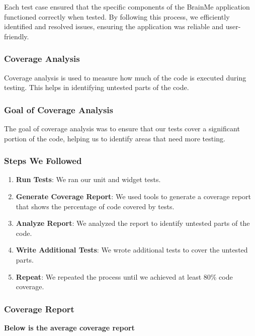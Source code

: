 \vspace{1cm}

Each test case ensured that the specific components of the BrainMe application functioned correctly when tested. By following this process, we efficiently identified and resolved issues, ensuring the application was reliable and user-friendly.

\subsubsection{Coverage Analysis}

Coverage analysis is used to measure how much of the code is executed during testing. This helps in identifying untested parts of the code.

\subsubsection{Goal of Coverage Analysis}

The goal of coverage analysis was to ensure that our tests cover a significant portion of the code, helping us to identify areas that need more testing.

\subsubsection{Steps We Followed}

\begin{enumerate}
    \item \textbf{Run Tests}: We ran our unit and widget tests.
    \item \textbf{Generate Coverage Report}: We used tools to generate a coverage report that shows the percentage of code covered by tests.
    \item \textbf{Analyze Report}: We analyzed the report to identify untested parts of the code.
    \item \textbf{Write Additional Tests}: We wrote additional tests to cover the untested parts.
    \item \textbf{Repeat}: We repeated the process until we achieved at least 80\% code coverage.
\end{enumerate}

\subsubsection{Coverage Report}

\textbf{Below is the average coverage report}

